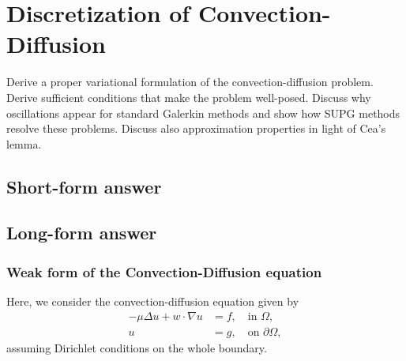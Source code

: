\section{Discretization of Convection-Diffusion}
Derive a proper variational formulation of the convection-diffusion problem.
Derive sufficient conditions that make the problem well-posed.
Discuss why oscillations appear for standard Galerkin methods and show how SUPG methods resolve these problems.
Discuss also approximation properties in light of Cea's lemma.

\subsection{Short-form answer}


\newpage
\subsection{Long-form answer}
\subsubsection{Weak form of the Convection-Diffusion equation}
Here, we consider the convection-diffusion equation given by
\begin{equation}
    \begin{split}
        -\mu \Delta u + w \cdot \nabla u &= f, \quad \text{in } \Omega,\\
        u &= g, \quad \text{on } \partial\Omega,
    \end{split}
\end{equation}
assuming Dirichlet conditions on the whole boundary.

